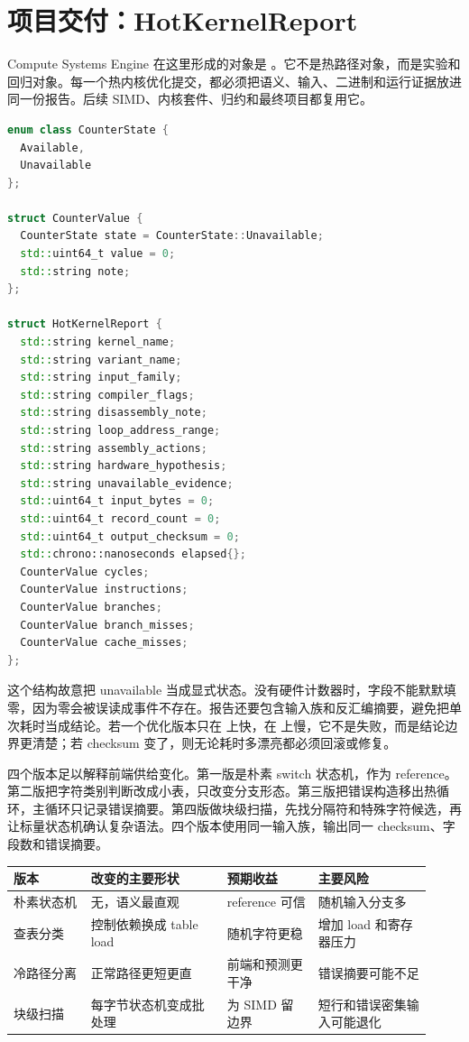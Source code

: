 \section{项目交付：HotKernelReport}

Compute Systems Engine 在这里形成的对象是 。它不是热路径对象，而是实验和回归对象。每一个热内核优化提交，都必须把语义、输入、二进制和运行证据放进同一份报告。后续 SIMD、内核套件、归约和最终项目都复用它。

\begin{lstlisting}[language=C++,caption={HotKernelReport 的最小形态}]
enum class CounterState {
  Available,
  Unavailable
};

struct CounterValue {
  CounterState state = CounterState::Unavailable;
  std::uint64_t value = 0;
  std::string note;
};

struct HotKernelReport {
  std::string kernel_name;
  std::string variant_name;
  std::string input_family;
  std::string compiler_flags;
  std::string disassembly_note;
  std::string loop_address_range;
  std::string assembly_actions;
  std::string hardware_hypothesis;
  std::string unavailable_evidence;
  std::uint64_t input_bytes = 0;
  std::uint64_t record_count = 0;
  std::uint64_t output_checksum = 0;
  std::chrono::nanoseconds elapsed{};
  CounterValue cycles;
  CounterValue instructions;
  CounterValue branches;
  CounterValue branch_misses;
  CounterValue cache_misses;
};
\end{lstlisting}

这个结构故意把 unavailable 当成显式状态。没有硬件计数器时，字段不能默默填零，因为零会被误读成事件不存在。报告还要包含输入族和反汇编摘要，避免把单次耗时当成结论。若一个优化版本只在  上快，在  上慢，它不是失败，而是结论边界更清楚；若 checksum 变了，则无论耗时多漂亮都必须回滚或修复。

四个版本足以解释前端供给变化。第一版是朴素 switch 状态机，作为 reference。第二版把字符类别判断改成小表，只改变分支形态。第三版把错误构造移出热循环，主循环只记录错误摘要。第四版做块级扫描，先找分隔符和特殊字符候选，再让标量状态机确认复杂语法。四个版本使用同一输入族，输出同一 checksum、字段数和错误摘要。

\begin{center}
\small
\begin{tabular}{@{}p{0.17\linewidth}p{0.30\linewidth}p{0.20\linewidth}p{0.25\linewidth}@{}}
\toprule
版本 & 改变的主要形状 & 预期收益 & 主要风险 \\
\midrule
朴素状态机 & 无，语义最直观 & reference 可信 & 随机输入分支多 \\
查表分类 & 控制依赖换成 table load & 随机字符更稳 & 增加 load 和寄存器压力 \\
冷路径分离 & 正常路径更短更直 & 前端和预测更干净 & 错误摘要可能不足 \\
块级扫描 & 每字节状态机变成批处理 & 为 SIMD 留边界 & 短行和错误密集输入可能退化 \\
\bottomrule
\end{tabular}
\end{center}

